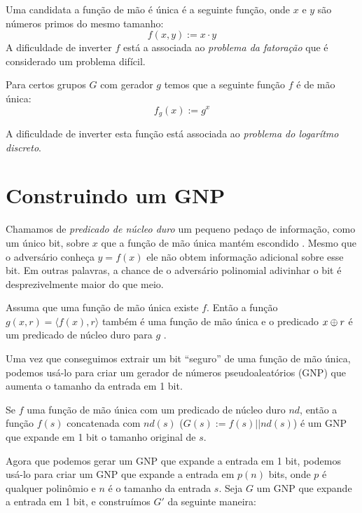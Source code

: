\begin{example}
  Uma candidata a função de mão é única é a seguinte função, onde $x$ e $y$ são números primos do mesmo tamanho:
  \begin{displaymath}
    f(x,y) := x \cdot y
  \end{displaymath}
  A dificuldade de inverter $f$ está a associada ao {\em problema da fatoração} que é considerado um problema difícil.

  Para certos grupos $G$ com gerador $g$ temos que a seguinte função $f$ é de mão única:
  \begin{displaymath}
    f_g(x) := g^x
  \end{displaymath}

A dificuldade de inverter esta função está associada ao {\em problema do logarítmo discreto}.
\end{example}

\section{Construindo um GNP}

Chamamos de {\em predicado de núcleo duro} um pequeno pedaço de informação, como um único bit, sobre $x$ que a função de mão única mantém escondido \cite{Blum84}.
Mesmo que o adversário conheça $y = f(x)$ ele não obtem informação adicional sobre esse bit.
Em outras palavras, a chance de o adversário polinomial adivinhar o bit é desprezivelmente maior do que meio.

\begin{theorem}
  Assuma que uma função de mão única existe $f$.
  Então a função $g(x,r) = \langle f(x), r \rangle$ também é uma função de mão única e o predicado $x \oplus r$ é um predicado de núcleo duro para $g$ \cite{Goldreich89}.
\end{theorem}

Uma vez que conseguimos extrair um bit ``seguro'' de uma função de mão única, podemos usá-lo para criar um gerador de números pseudoaleatórios (GNP) que aumenta o tamanho da entrada em 1 bit.

\begin{theorem}
  Se $f$ uma função de mão única com um predicado de núcleo duro $nd$, então a função $f(s)$ concatenada com $nd(s)$ ($G(s) := f(s)||nd(s)$) é um GNP que expande em 1 bit o tamanho original de $s$.
\end{theorem}

Agora que podemos gerar um GNP que expande a entrada em 1 bit, podemos usá-lo para criar um GNP que expande a entrada em $p(n)$ bits, onde $p$ é qualquer polinômio e $n$ é o tamanho da entrada $s$.
Seja $G$ um GNP que expande a entrada em 1 bit, e construímos $G'$ da seguinte maneira:

